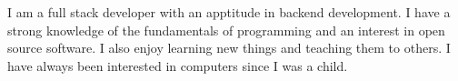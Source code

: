 

\begin{cvparagraph}

I am a full stack developer with an apptitude in backend development.
I have a strong knowledge of the fundamentals of programming and an interest in open source software. 
I also enjoy learning new things and teaching them to others. 
I have always been interested in computers since I was a child.

\end{cvparagraph}
